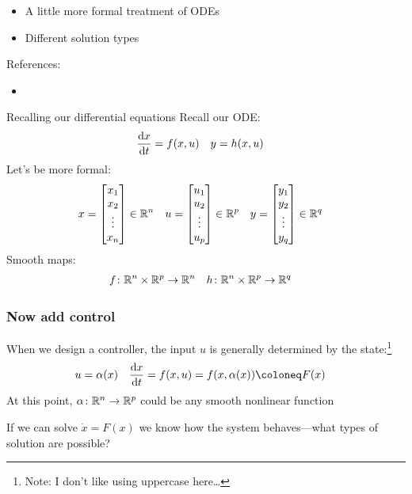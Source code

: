 \documentclass[10pt]{beamer-control}
\begin{document}

\begin{SUMMARY}
  \begin{itemize}
    \item A little more formal treatment of ODEs
    \item Different solution types
  \end{itemize}
  \vfill References:
  \begin{itemize}
    \item \astrom[§5.1]
  \end{itemize}
\end{SUMMARY}



\begin{frame}{Recalling our differential equations}
  Recall our ODE:
  \begin{align}
    \frac{\mathrm{d} x}{\mathrm{d} t} &= f(x,u) & y &= h(x,u)
  \end{align}
  Let's be more formal:
  \begin{align}
    x &= \begin{bmatrix}x_1\\x_2\\\vdots\\x_n\end{bmatrix} \in \mathbb{R}^n &
    u &= \begin{bmatrix}u_1\\u_2\\\vdots\\u_p\end{bmatrix} \in \mathbb{R}^p &
    y &= \begin{bmatrix}y_1\\y_2\\\vdots\\y_q\end{bmatrix} \in \mathbb{R}^q
  \end{align}
  Smooth maps:
  \begin{align}
    f&\colon\mathbb{R}^n \times \mathbb{R}^p \to \mathbb{R}^n &
    h&\colon\mathbb{R}^n \times \mathbb{R}^p \to \mathbb{R}^q
  \end{align}
\end{frame}

\begin{frame}
  \frametitle{Now add control}
  When we design a controller, the input $u$ is generally determined by the state:\footnote{Note: I don't like using uppercase here\dots}
  \begin{align}
    u &= \alpha(x) & \Deriv{x}{t} &= f(x,u) = f(x,\alpha(x)) \coloneq F(x) \label{eq:Fx}
  \end{align}
  At this point, $\alpha\colon\mathbb{R}^n \to \mathbb{R}^p$ could be any smooth nonlinear function
  \bigskip

  If we can solve $\dot x=F(x)$ we know how the system behaves---what types of solution are possible?
\end{frame}
\end{document}
